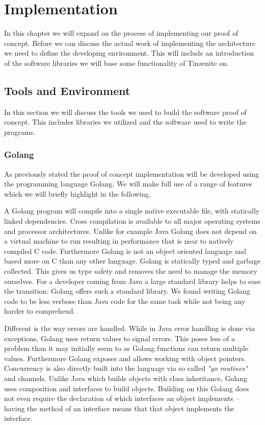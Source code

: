 \chapter{Implementation}
\label{chap:Implementation}

In this chapter we will expand on the process of implementing our proof of concept.
Before we can discuss the actual work of implementing the architecture we need to define the developing environment.
This will include an introduction of the software libraries we will base some functionality of Tinzenite on.

\section{Tools and Environment}
\label{sec:Tools and Environment}

In this section we will discuss the tools we used to build the software proof of concept.
This includes libraries we utilized and the software used to write the programs.

\subsection{Golang}
\label{sub:Golang}

As previously stated the proof of concept implementation will be developed using the programming language Golang.
We will make full use of a range of features which we will briefly highlight in the following.

A Golang program will compile into a single native executable file, with statically linked dependencies.
Cross compilation is available to all major operating systems and processor architectures.
Unlike for example Java Golang does not depend on a virtual machine to run resulting in performance that is near to natively compiled C code.
Furthermore Golang is not an object oriented language and based more on C than any other language.
Golang is statically typed and garbage collected.
This gives us type safety and removes the need to manage the memory ourselves.
For a developer coming from Java a large standard library helps to ease the transition: Golang offers such a standard library.
We found writing Golang code to be less verbose than Java code for the same task while not being any harder to comprehend.

Different is the way errors are handled.
While in Java error handling is done via exceptions, Golang uses return values to signal errors.
This poses less of a problem than it may initially seem to as Golang functions can return multiple values.
Furthermore Golang exposes and allows working with object pointers.
Concurrency is also directly built into the language via so called \textit{"go routines"} and channels.
Unlike Java which builds objects with class inheritance, Golang uses composition and interfaces to build objects.
Building on this Golang does not even require the declaration of which interfaces an object implements -- having the method of an interface means that that object implements the interface.

